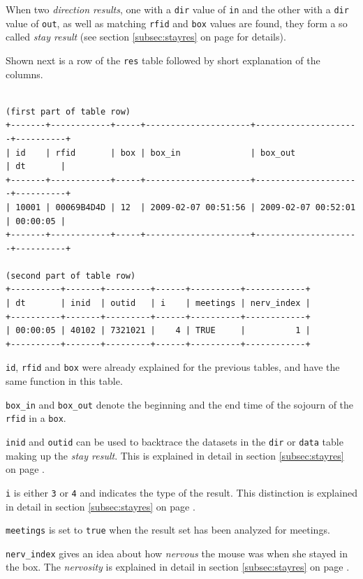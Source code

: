 When two \textit{direction results}, one with a \lstinline|dir| value of \lstinline|in| and the other with a \lstinline|dir| value of \lstinline|out|, as well as matching \lstinline|rfid| and \lstinline|box| values are found, they form a so called \textit{stay result} (see section \ref{subsec:stayres} on page \pageref{subsec:stayres} for details).

Shown next is a row of the \lstinline|res| table followed by short explanation of the columns.

\codescript
\begin{lstlisting}[frame=none]

(first part of table row)
+-------+------------+-----+---------------------+---------------------+----------+
| id    | rfid       | box | box_in              | box_out             | dt       |
+-------+------------+-----+---------------------+---------------------+----------+
| 10001 | 00069B4D4D | 12  | 2009-02-07 00:51:56 | 2009-02-07 00:52:01 | 00:00:05 |
+-------+------------+-----+---------------------+---------------------+----------+

(second part of table row)
+----------+-------+---------+------+----------+------------+
| dt       | inid  | outid   | i    | meetings | nerv_index |
+----------+-------+---------+------+----------+------------+
| 00:00:05 | 40102 | 7321021 |    4 | TRUE     |          1 | 
+----------+-------+---------+------+----------+------------+

\end{lstlisting}

\begin{mydesc}
	\item \lstinline|id|, \lstinline|rfid| and \lstinline|box| were already explained for the previous tables, and have the same function in this table.
	\item \lstinline|box_in| and \lstinline|box_out| denote the beginning and the end time of the sojourn of the \lstinline|rfid| in a \lstinline|box|.
	 \item \lstinline|inid| and \lstinline|outid| can be used to backtrace the datasets in the \lstinline|dir| or \lstinline|data| table making up the \textit{stay result}. This is explained in detail in section \ref{subsec:stayres} on page \pageref{subsec:stayres}.
	 \item \lstinline|i| is either \lstinline|3| or \lstinline|4| and indicates the type of the result. This distinction is explained in detail in section \ref{subsec:stayres} on page \pageref{subsec:stayres}.
	 \item \lstinline|meetings| is set to \lstinline|true| when the result set has been analyzed for meetings.
	 \item \lstinline|nerv_index| gives an idea about how \textit{nervous} the mouse was when she stayed in the box. The \textit{nervosity} is explained in detail in section \ref{subsec:stayres} on page \pageref{subsec:stayres}. 
\end{mydesc}

